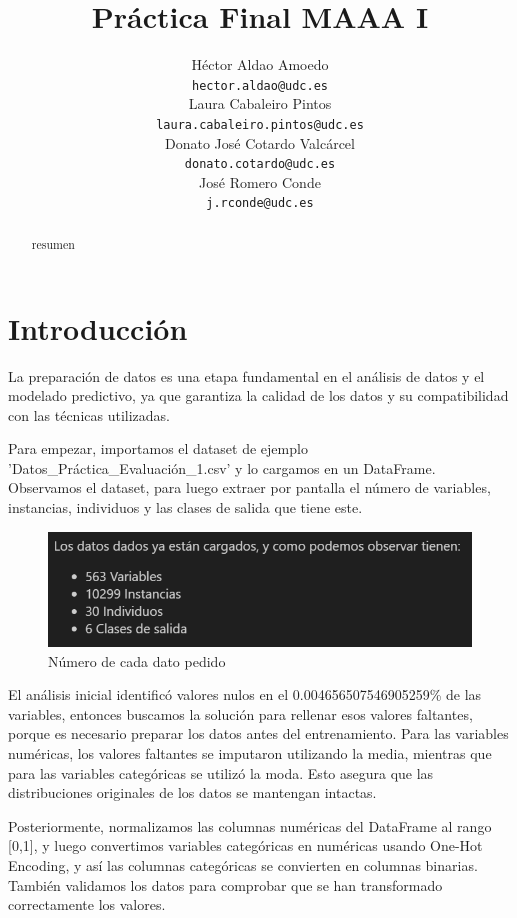 \documentclass{article}
\title{Práctica Final MAAA I}
\author{
	\AND
	Héctor Aldao Amoedo\\
	\texttt{hector.aldao@udc.es}\\  
	\And
	Laura Cabaleiro Pintos\\
	\texttt{laura.cabaleiro.pintos@udc.es}\\
	\And
	Donato José Cotardo Valcárcel \\
	\texttt{donato.cotardo@udc.es}\\
	\And
	José Romero Conde\\
	\texttt{j.rconde@udc.es}\\
	\And  
}
\begin{document}
	
	
	\maketitle
	
	\begin{abstract}
		
		resumen
		
	\end{abstract}
	
	\section{Introducción}
	
La preparación de datos es una etapa fundamental en el análisis de datos y el modelado predictivo, ya que garantiza la calidad de los datos y su compatibilidad con las técnicas utilizadas.

Para empezar, importamos el dataset de ejemplo 'Datos\_Práctica\_Evaluación\_1.csv' y lo cargamos en un DataFrame. Observamos el dataset, para luego extraer por pantalla el número de variables, instancias, individuos y las clases de salida que tiene este.

\begin{figure}[h]
    \centering
    \includegraphics[width=0.75\linewidth]{images/datos.png}
    \caption{Número de cada dato pedido}
    \label{fig:enter-label}
\end{figure}

El análisis inicial identificó valores nulos en el 0.004656507546905259\% de las variables, entonces buscamos la solución para rellenar esos valores faltantes, porque es necesario preparar los datos antes del entrenamiento. Para las variables numéricas, los valores faltantes se imputaron utilizando la media, mientras que para las variables categóricas se utilizó la moda. Esto asegura que las distribuciones originales de los datos se mantengan intactas.

Posteriormente, normalizamos las columnas numéricas del DataFrame al rango [0,1], y luego convertimos variables categóricas en numéricas usando One-Hot Encoding, y así las columnas categóricas se convierten en columnas binarias. También validamos los datos para comprobar que se han transformado correctamente los valores.
\end{document}
